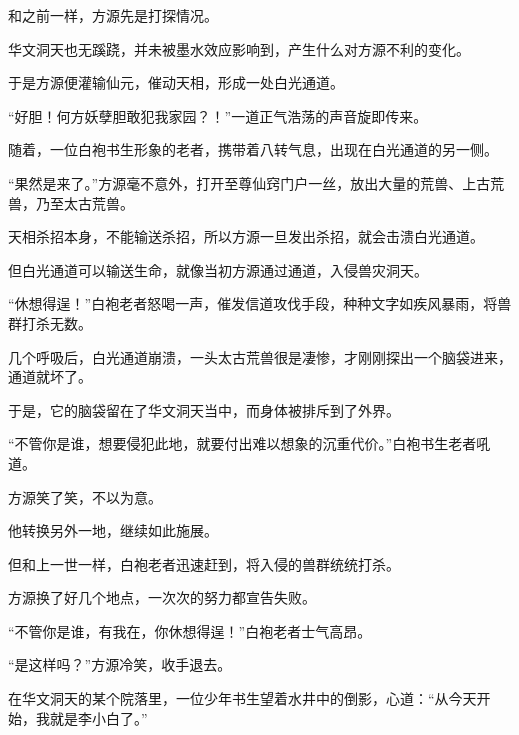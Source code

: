 \begin{this_body}
和之前一样，方源先是打探情况。

华文洞天也无蹊跷，并未被墨水效应影响到，产生什么对方源不利的变化。

于是方源便灌输仙元，催动天相，形成一处白光通道。

“好胆！何方妖孽胆敢犯我家园？！”一道正气浩荡的声音旋即传来。

随着，一位白袍书生形象的老者，携带着八转气息，出现在白光通道的另一侧。

“果然是来了。”方源毫不意外，打开至尊仙窍门户一丝，放出大量的荒兽、上古荒兽，乃至太古荒兽。

天相杀招本身，不能输送杀招，所以方源一旦发出杀招，就会击溃白光通道。

但白光通道可以输送生命，就像当初方源通过通道，入侵兽灾洞天。

“休想得逞！”白袍老者怒喝一声，催发信道攻伐手段，种种文字如疾风暴雨，将兽群打杀无数。

几个呼吸后，白光通道崩溃，一头太古荒兽很是凄惨，才刚刚探出一个脑袋进来，通道就坏了。

于是，它的脑袋留在了华文洞天当中，而身体被排斥到了外界。

“不管你是谁，想要侵犯此地，就要付出难以想象的沉重代价。”白袍书生老者吼道。

方源笑了笑，不以为意。

他转换另外一地，继续如此施展。

但和上一世一样，白袍老者迅速赶到，将入侵的兽群统统打杀。

方源换了好几个地点，一次次的努力都宣告失败。

“不管你是谁，有我在，你休想得逞！”白袍老者士气高昂。

“是这样吗？”方源冷笑，收手退去。

在华文洞天的某个院落里，一位少年书生望着水井中的倒影，心道：“从今天开始，我就是李小白了。”

\end{this_body}

